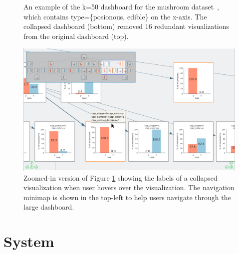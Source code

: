 {\begin{figure}[ht!]
  \caption{An example of the k=50 dashboard for the mushroom dataset~\cite{mushroom}, which contains type=\{posionous, edible\} on the x-axis. The collapsed dashboard (bottom) removed 16 redundant visualizations from the original dashboard (top).}
  \label{fig:collapse_demo}
  \end{figure}
  \begin{figure}[ht!]
  \centering
  \includegraphics[width=\linewidth]{figures/minimap_zoom.png}
  \caption{Zoomed-in version of Figure \ref{fig:collapse_demo} showing the labels of a collapsed visualization when user hovers over the visualization. The navigation minimap is shown in the top-left to help users navigate through the large dashboard.}
  \label{fig:hover_minimap}
  \end{figure}
}



\iffalse
\section{System\label{sec:system}}
